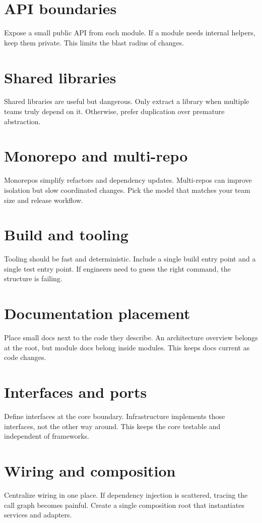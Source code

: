 \section{API boundaries}
Expose a small public API from each module.
If a module needs internal helpers, keep them private.
This limits the blast radius of changes.

\section{Shared libraries}
Shared libraries are useful but dangerous.
Only extract a library when multiple teams truly depend on it.
Otherwise, prefer duplication over premature abstraction.

\section{Monorepo and multi-repo}
Monorepos simplify refactors and dependency updates.
Multi-repos can improve isolation but slow coordinated changes.
Pick the model that matches your team size and release workflow.

\section{Build and tooling}
Tooling should be fast and deterministic.
Include a single build entry point and a single test entry point.
If engineers need to guess the right command, the structure is failing.

\section{Documentation placement}
Place small docs next to the code they describe.
An architecture overview belongs at the root, but module docs belong inside modules.
This keeps docs current as code changes.

\section{Interfaces and ports}
Define interfaces at the core boundary.
Infrastructure implements those interfaces, not the other way around.
This keeps the core testable and independent of frameworks.

\section{Wiring and composition}
Centralize wiring in one place.
If dependency injection is scattered, tracing the call graph becomes painful.
Create a single composition root that instantiates services and adapters.

